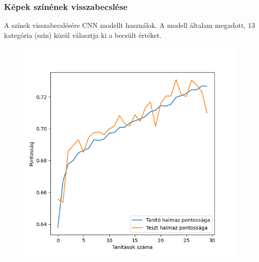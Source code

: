 \documentclass{beamer}
\begin{document}
\begin{frame}[fragile]
\frametitle{Képek színének visszabecslése}
A színek visszabecslésére CNN modellt használok. A modell általam megadott, 13 kategória (szín) közül választja ki a becsült értéket. 

\bigskip

\begin{figure}[!tbp]
  \centering
  \begin{minipage}[b]{0.5\textwidth}
    \includegraphics[width=\textwidth]{images/cnn_accuracy.png}
  \end{minipage}
\end{figure}
\end{frame}
\end{document}
